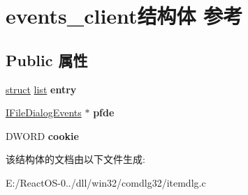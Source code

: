 \hypertarget{structevents__client}{}\section{events\+\_\+client结构体 参考}
\label{structevents__client}
\subsection*{Public 属性}
\begin{DoxyCompactItemize}
\item 
\mbox{\label{structevents__client_af7dc7d8a1066e2575db03210f7fef18c}} 
\hyperlink{interfacestruct}{struct} \hyperlink{classlist}{list} {\bfseries entry}
\item 
\mbox{\label{structevents__client_aae5c423ba6bdab8754db21019eb3886a}} 
\hyperlink{interface_i_file_dialog_events}{I\+File\+Dialog\+Events} $\ast$ {\bfseries pfde}
\item 
\mbox{\label{structevents__client_a3b01de14b218023b9ed4189d035768f2}} 
D\+W\+O\+RD {\bfseries cookie}
\end{DoxyCompactItemize}


该结构体的文档由以下文件生成\+:\begin{DoxyCompactItemize}
\item 
E\+:/\+React\+O\+S-\/0../dll/win32/comdlg32/itemdlg.\+c\end{DoxyCompactItemize}
